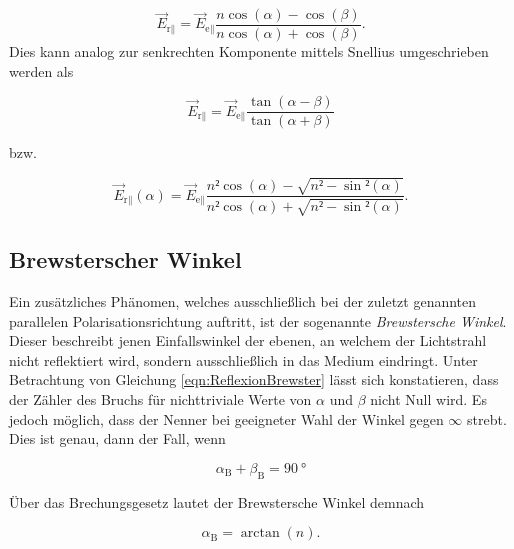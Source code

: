 \begin{equation*}
    \vec{E}_{\text{r}\parallel} = \vec{E}_{\text{e}\parallel}\frac{n\cos(\alpha)-\cos(\beta)}{n\cos(\alpha)+\cos(\beta)}.
\end{equation*}
 \noindent Dies kann analog zur senkrechten Komponente mittels Snellius umgeschrieben werden als 

 \begin{equation}
    \vec{E}_{\text{r}\parallel} = \vec{E}_{\text{e}\parallel}\frac{\tan(\alpha-\beta)}{\tan(\alpha+\beta)}
\label{eqn:ReflexionBrewster} 
\end{equation}

 \noindent bzw.

\begin{equation}
    \vec{E}_{\text{r}\parallel}(\alpha) = \vec{E}_{\text{e}\parallel}\frac{n²\cos(\alpha)-\sqrt{n²-\sin²(\alpha)}}{n²\cos(\alpha)+\sqrt{n²-\sin²(\alpha)}}.
\label{eqn:21}
\end{equation}

\subsection{Brewsterscher Winkel}
\label{sec:Brewster}

Ein zusätzliches Phänomen, welches ausschließlich bei der zuletzt genannten parallelen Polarisationsrichtung auftritt, ist der sogenannte \emph{Brewstersche Winkel}.
Dieser beschreibt jenen Einfallswinkel der ebenen, an welchem der Lichtstrahl nicht reflektiert wird, sondern ausschließlich in das Medium eindringt.
Unter Betrachtung von Gleichung \eqref{eqn:ReflexionBrewster} lässt sich konstatieren, dass der Zähler des Bruchs für nichttriviale Werte von $\alpha$ und $\beta$ nicht
Null wird. Es jedoch möglich, dass der Nenner bei geeigneter Wahl der Winkel gegen $\infty$ strebt. Dies ist genau, dann der Fall, wenn 

\begin{equation*}
    \alpha_\text{B} + \beta_\text{B} = \qty{90}{\degree}
\end{equation*}

\noindent Über das Brechungsgesetz lautet der Brewstersche Winkel demnach

\begin{equation}
    \alpha_\text{B} = \arctan(n).
    \label{eqn:brews_tan}
\end{equation}

%